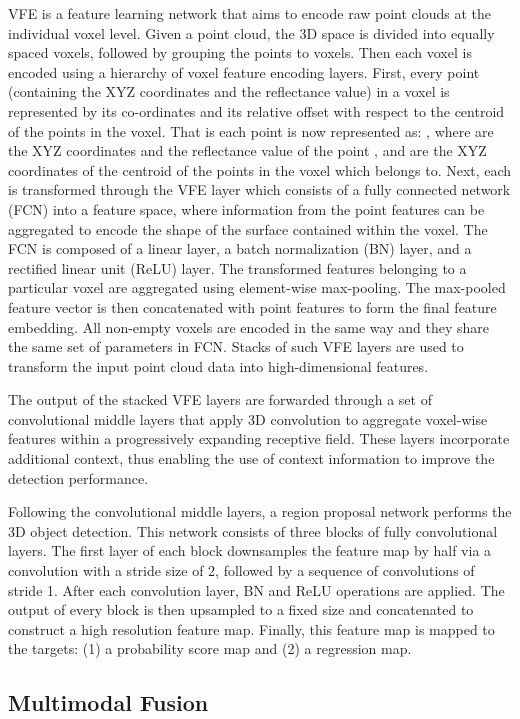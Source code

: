 \documentclass[letterpaper, 10 pt, conference]{ieeeconf}
\begin{document}
VFE is a feature learning network that aims to encode raw point clouds at the individual voxel level. Given a point cloud, the 3D space is divided into equally spaced voxels, followed by grouping the points to voxels. Then each voxel is encoded using a hierarchy of voxel feature encoding layers. First, every point  (containing the XYZ coordinates and the reflectance value) in a voxel is represented by its co-ordinates and its relative offset with respect to the centroid of the points in the voxel. That is each point is now represented as: , where  are the XYZ coordinates and the reflectance value of the point , and  are the XYZ coordinates of the centroid of the points in the voxel which  belongs to. Next, each  is transformed through the VFE layer which consists of a fully connected network (FCN) into a feature space, where information from the point features can be aggregated to encode the shape of the surface contained within the voxel. The FCN is composed of a linear layer, a batch normalization (BN) layer, and a rectified linear unit (ReLU) layer. The transformed features belonging to a particular voxel are aggregated using element-wise max-pooling. The max-pooled feature vector is then concatenated with point features to form the final feature embedding. All non-empty voxels are encoded in the same way and they share the same set of parameters in FCN. Stacks of such VFE layers are used to transform the input point cloud data into high-dimensional features. 

The output of the stacked VFE layers are forwarded through a set of convolutional middle layers that apply 3D convolution to aggregate voxel-wise features within a progressively expanding receptive field. These layers incorporate additional context, thus enabling the use of context information to improve the detection performance. 


Following the convolutional middle layers, a region proposal network \cite{girshick2015fast} performs the 3D object detection. This network consists of three blocks of fully convolutional layers. The first layer of each block downsamples the feature map by half via a convolution with a stride size of 2, followed by a sequence of convolutions of stride 1. After each convolution layer, BN and ReLU operations are applied. The output of every block is then upsampled to a fixed size and concatenated to construct a high resolution feature map. Finally, this feature map is mapped to the targets: (1) a probability score map and (2) a regression map. 


\subsection{Multimodal Fusion}
\label{ssec:mfusion}
\end{document}
